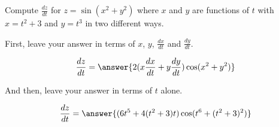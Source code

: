 \documentclass{ximera}
\author{David Guichard \and Neal Koblitz \and H. Jerome Keisler \and Albert Scheller \and Barry Balof \and Mike Wills \and Matthew Carr}
\begin{document}
\begin{exercise}




Compute $\frac{dz}{dt}$ for $z=\sin(x^2+y^2)$ where $x$ and $y$ are functions of $t$ with $x=t^2+3$ and $y=t^3$ in two different ways.

First, leave your answer in terms of $x$, $y$, $\frac{dx}{dt}$ and $\frac{dy}{dt}$.

\begin{prompt}
\[
\frac{dz}{dt}=\answer{2(x\frac{dx}{dt}+y\frac{dy}{dt})\cos(x^2+y^2)}
\]
\end{prompt}

And then, leave your answer in terms of $t$ alone.

\begin{prompt}
\[
\frac{dz}{dt}=\answer{(6 t^5+4 (t^2+3)t) \cos(t^6+(t^2+3)^2)}
\]
\end{prompt}


\end{exercise}
\end{document}
